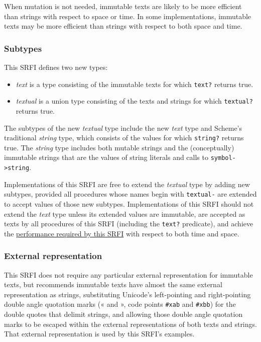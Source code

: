 When mutation is not needed, immutable texts are likely to be more
efficient than strings with respect to space or time. In some
implementations, immutable texts may be more efficient than strings with
respect to both space and time.

\subsubsection{{Subtypes}}\label{subtypes}

This SRFI defines two new types:

\begin{itemize}
\tightlist
\item
  \emph{text} is a type consisting of the immutable texts for which
  \texttt{text?} returns true.
\item
  \emph{textual} is a union type consisting of the texts and strings for
  which \texttt{textual?} returns true.
\end{itemize}

The subtypes of the new \emph{textual} type include the new \emph{text}
type and Scheme's traditional \emph{string} type, which consists of the
values for which \texttt{string?} returns true. The \emph{string} type
includes both mutable strings and the (conceptually) immutable strings
that are the values of string literals and calls to
\texttt{symbol-\textgreater{}string}.

Implementations of this SRFI are free to extend the \emph{textual} type
by adding new subtypes, provided all procedures whose names begin with
\texttt{textual-} are extended to accept values of those new subtypes.
Implementations of this SRFI should not extend the \emph{text} type
unless its extended values are immutable, are accepted as texts by all
procedures of this SRFI (including the \texttt{text?} predicate), and
achieve the \protect\hyperlink{PerformanceRequirements}{performance
required by this SRFI} with respect to both time and space.

\subsubsection{{External representation}}\label{external-representation}

This SRFI does not require any particular external representation for
immutable texts, but recommends immutable texts have almost the same
external representation as strings, substituting Unicode's left-pointing
and right-pointing double angle quotation marks (« and », code points
\texttt{\#xab} and \texttt{\#xbb}) for the double quotes that delimit
strings, and allowing those double angle quotation marks to be escaped
within the external representations of both texts and strings. That
external representation is used by this SRFI's examples.

